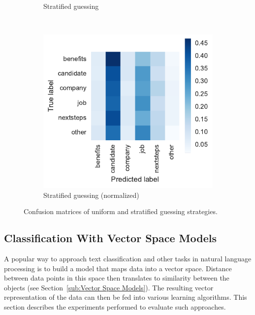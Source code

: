 \begin{figure}
\begin{subfigure}[b]{0.47\textwidth}
        \caption{Stratified guessing}
\label{fig:guessing-conf-matrix-stratified}
    \end{subfigure}
~\begin{subfigure}[b]{0.48\textwidth}
        \includegraphics[width=\textwidth]{img/exp-vector-space/guessing-conf-matrix-stratified-normalized.pdf}
        \caption{Stratified guessing (normalized)}
\label{fig:guessing-stratified-normalized}
    \end{subfigure}
    \caption{Confusion matrices of uniform and stratified guessing strategies.}
\label{fig:guessing-conf-matrix}
\end{figure}

\clearpage

\subsection{Classification With Vector Space Models}
\label{sub:Classification With Vector Space Models}

A popular way to approach text classification and other tasks in natural language processing is to build a model that maps data into a vector space. Distance between data points in this space then translates to similarity between the objects (see Section~\ref{sub:Vector Space Models}).
The resulting vector representation of the data can then be fed into various learning algorithms. This section describes the experiments performed to evaluate such approaches.

